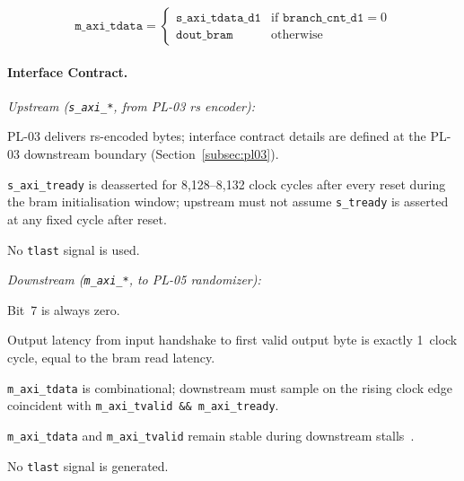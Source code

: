 \begin{equation}
  \mathtt{m\_axi\_tdata} =
  \begin{cases}
    \mathtt{s\_axi\_tdata\_d1} & \text{if } \mathtt{branch\_cnt\_d1} = 0 \\
    \mathtt{dout\_bram}        & \text{otherwise}
  \end{cases}
  \label{eq:interleaver_mux}
\end{equation}

\FloatBarrier


\paragraph{Interface Contract.}

\textit{Upstream (\texttt{s\_axi\_*}, from PL-03 \ac{rs} encoder):}
\begin{tightemize}
  \item PL-03 delivers \ac{rs}-encoded bytes; interface contract details
        are defined at the PL-03 downstream boundary
        (Section~\ref{subsec:pl03}).
  \item \texttt{s\_axi\_tready} is deasserted for 8{,}128--8{,}132 clock
        cycles after every reset during the \ac{bram} initialisation
        window; upstream must not assume \texttt{s\_tready} is asserted
        at any fixed cycle after reset.
  \item No \texttt{tlast} signal is used.
\end{tightemize}

\textit{Downstream (\texttt{m\_axi\_*}, to PL-05 randomizer):}
\begin{tightemize}
  \item Bit~7 is always zero.
  \item Output latency from input handshake to first valid output byte
        is exactly 1~clock cycle, equal to the \ac{bram} read latency.
  \item \texttt{m\_axi\_tdata} is combinational; downstream must sample
        on the rising clock edge coincident with
        \texttt{m\_axi\_tvalid}~\texttt{\&\&}~\texttt{m\_axi\_tready}.
  \item \texttt{m\_axi\_tdata} and \texttt{m\_axi\_tvalid} remain stable
        during downstream stalls~\cite{ARM_IHI0022}.
  \item No \texttt{tlast} signal is generated.
\end{tightemize}

